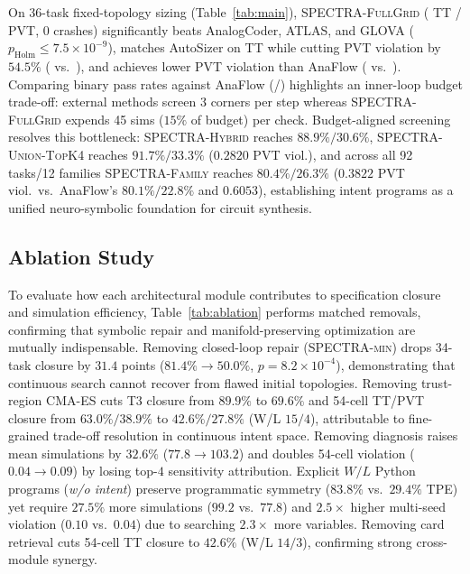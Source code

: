 \documentclass{article}
\theoremstyle{plain}
\begin{document}
On 36-task fixed-topology sizing (Table~\ref{tab:main}), \textsc{SPECTRA-FullGrid} (\SizSpectraTTPct{} TT / \SizSpectraPVTPct{} PVT, 0 crashes) significantly beats AnalogCoder, ATLAS, and GLOVA ($p_{\text{Holm}} \le 7.5\times 10^{-9}$), matches AutoSizer on TT while cutting PVT violation by $54.5\%$ (\SizSpectraPVTViol{} vs.\ \SizAutoSizerPVTViol{}), and achieves lower PVT violation than AnaFlow (\SizSpectraPVTViol{} vs.\ \SizAnaFlowPVTViol{}). Comparing binary pass rates against AnaFlow (\SizAnaFlowTTPct{}/\SizAnaFlowPVTPct{}) highlights an inner-loop budget trade-off: external methods screen 3 corners per step whereas \textsc{SPECTRA-FullGrid} expends 45 sims ($15\%$ of budget) per check. Budget-aligned screening resolves this bottleneck: \textsc{SPECTRA-Hybrid} reaches $88.9\%/30.6\%$, \textsc{SPECTRA-Union-TopK4} reaches $91.7\%/33.3\%$ ($0.2820$ PVT viol.), and across all 92 tasks/12 families \textsc{SPECTRA-Family} reaches $80.4\%/26.3\%$ ($0.3822$ PVT viol.\ vs.\ AnaFlow's $80.1\%/22.8\%$ and $0.6053$), establishing intent programs as a unified neuro-symbolic foundation for circuit synthesis.

\subsection{Ablation Study}

To evaluate how each architectural module contributes to specification closure and simulation efficiency, Table~\ref{tab:ablation} performs matched removals, confirming that symbolic repair and manifold-preserving optimization are mutually indispensable. Removing closed-loop repair (\textsc{SPECTRA-min}) drops 34-task closure by $31.4$ points ($81.4\% \to 50.0\%$, $p=8.2\times 10^{-4}$), demonstrating that continuous search cannot recover from flawed initial topologies. Removing trust-region CMA-ES cuts T3 closure from $89.9\%$ to $69.6\%$ and 54-cell TT/PVT closure from $63.0\%/38.9\%$ to $42.6\%/27.8\%$ (W/L $15/4$), attributable to fine-grained trade-off resolution in continuous intent space. Removing diagnosis raises mean simulations by $32.6\%$ ($77.8 \to 103.2$) and doubles 54-cell violation ($0.04 \to 0.09$) by losing top-$4$ sensitivity attribution. Explicit $W/L$ Python programs (\emph{w/o intent}) preserve programmatic symmetry ($83.8\%$ vs.\ $29.4\%$ TPE) yet require $27.5\%$ more simulations ($99.2$ vs.\ $77.8$) and $2.5\times$ higher multi-seed violation ($0.10$ vs.\ $0.04$) due to searching $2.3\times$ more variables. Removing card retrieval cuts 54-cell TT closure to $42.6\%$ (W/L $14/3$), confirming strong cross-module synergy.
\end{document}
